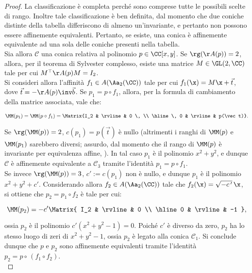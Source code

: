\documentclass[11pt]{article}
\begin{document}
	\begin{proof}
		La classificazione è completa perché sono comprese tutte le possibili
		scelte di rango. Inoltre tale classificazione è ben definita, dal momento che due coniche distinte della tabella differiscono di almeno un'invariante, e pertanto non possono essere affinemente
		equivalenti. Pertanto, se esiste, una conica è affinemente equivalente
		ad una sola delle coniche presenti nella tabella. \\
		
		Sia allora $\mathcal{C}$ una conica relativa al polinomio $p \in \CC[x, y]$. Se $\rg(\AA(p)) = 2$, allora, per il teorema di Sylvester
		complesso, esiste una matrice $M \in \GL(2, \CC)$ tale per
		cui $M^\top \AA(p) M = I_2$. \\
		
		Si consideri allora l'affinità $f_1 \in A(\Aa_2(\CC))$ tale per cui $f_1(\x) = M\x + \vec t$, dove $\vec t = - \AA(p)\inv \vec b$. Se $p_1 = p \circ f_1$, allora, per la formula
		di cambiamento della matrice associata, vale che:
		
		\[ \MM(p_1) = \MM(p \circ f_1) = \Matrix{I_2 & \rvline & 0 \, \\ \hline \, 0 & \rvline & p(\vec t)}. \]
		
		\vskip 0.05in
		
		Se $\rg(\MM(p)) = 2$, $c(p_1) = p(\vec t)$ è nullo (altrimenti i ranghi di $\MM(p)$ e $\MM(p_1)$ sarebbero diversi; assurdo, dal momento che il rango di $\MM(p)$ è invariante per equivalenza affine, \Lightning).
		In tal caso $p_1$ è il polinomio $x^2 + y^2$, e
		dunque $\mathcal{C}$ è affinemente equivalente a $\mathcal{C}_3$ tramite
		l'identità $p_1 = p \circ f_1$. \\
		
		Se invece $\rg(\MM(p)) = 3$, $c' := c(p_1)$ non è nullo,
		e dunque $p_1$ è il polinomio $x^2 + y^2 + c'$. Considerando
		allora $f_2 \in A(\Aa_2(\CC))$ tale che $f_2(\x) = \sqrt{-c\,'} \, \x$, si ottiene che $p_2 = p_1 \circ f_2$ è tale per cui:
		
		\[ \MM(p_2) = -c' \Matrix{ I_2 & \rvline & 0 \\ \hline 0 & \rvline & -1 }, \]
		
		\vskip 0.05in
		
		ossia $p_2$ è il polinomio $c'(x^2 + y^2 - 1) = 0$. Poiché
		$c'$ è diverso da zero, $p_2$ ha lo stesso luogo di zeri
		di $x^2 + y^2 - 1$, ossia $p_2$ è legato alla conica
		$\mathcal{C}_1$. Si conclude dunque che $p$ e $p_2$
		sono affinemente equivalenti tramite l'identità
		$p_2 = p \circ \, (f_1 \circ f_2)$. \\
		

\end{proof}
\end{document}
